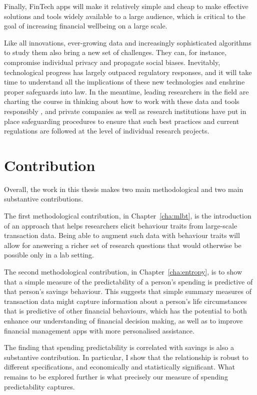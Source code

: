 Finally, FinTech apps will make it relatively simple and cheap to make
effective solutions and tools widely available to a large audience, which is
critical to the goal of increasing financial wellbeing on a large scale.

Like all innovations, ever-growing data and increasingly sophisticated algorithms to study them also bring a new set of challenges. They can, for instance, compromise individual privacy and propagate
social biases. Inevitably, technological progress has largely outpaced
regulatory responses, and it will take time to understand all the implications
of these new technologies and enshrine proper safeguards into law. In the
meantime, leading researchers in the field are charting the course in thinking
about how to work with these data and tools responsibly
\citep{demontjoye2015unique, kosinski2015facebook, blumenstock2018don}, and
private companies as well as research institutions have put in place
safeguarding procedures to ensure that such best practices and current
regulations are followed at the level of individual research projects.

\section{Contribution}

Overall, the work in this thesis makes two main methodological and two main substantive contributions.

The first methodological contribution, in Chapter~\ref{cha:mlbt}, is the introduction of an approach that helps researchers elicit behaviour traits from large-scale transaction data. Being able to augment such data with behaviour traits will allow for answering a richer set of research questions that would otherwise be possible only in a lab setting.

The second methodological contribution, in Chapter~\ref{cha:entropy}, is to show that a simple measure of the predictability of a person's spending is predictive of that person's savings behaviour. This suggests that simple summary measures of transaction data might capture information about a person's life circumstances that is predictive of other financial behaviours, which has the potential to both enhance our understanding of financial decision making, as well as to improve financial management apps with more personalised assistance.

The finding that spending predictability is correlated with savings is also a substantive contribution. In particular, I show that the relationship is robust to different specifications, and economically and statistically significant. What remains to be explored further is what precisely our measure of spending predictability captures.

